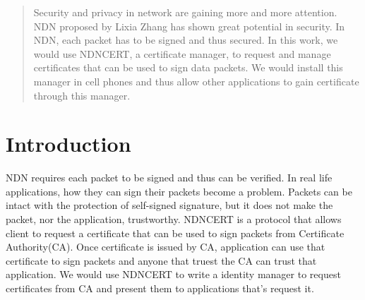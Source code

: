 \documentclass[a0,portrait]{poster}
\begin{document}
\begin{multicols}{2} %


\color{Navy} %

\begin{abstract}

Security and privacy in network are gaining more and more attention. NDN proposed by Lixia Zhang has shown great potential in security. In NDN, each packet has to be signed and thus secured. In this work, we would use NDNCERT, a certificate manager, to request and manage certificates that can be used to sign data packets. We would install this manager in cell phones and thus allow other applications to gain certificate through this manager. 

\end{abstract}


\color{SaddleBrown} %

\section*{Introduction}
NDN requires each packet to be signed and thus can be verified. In real life applications, how they can sign their packets become a problem. Packets can be intact with the protection of self-signed signature, but it does not make the packet, nor the application, trustworthy. NDNCERT is a protocol that allows client to request a certificate that can be used to sign packets from Certificate Authority(CA). Once certificate is issued by CA, application can use that certificate to sign packets and anyone that truest the CA can trust that application. We would use NDNCERT to write a identity manager to request certificates from CA and present them to applications that's request it.



\end{multicols}
\end{document}
